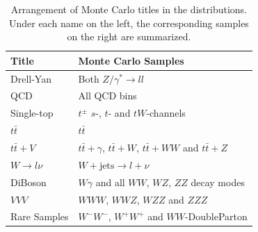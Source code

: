 \begin{table}[!htb]
  \centering
  \begin{tabular}{|l|l|}
\hline
Title & Monte Carlo Samples \\
\hline
Drell-Yan & Both $Z/\gamma^* \rightarrow ll$ \\
QCD & All QCD bins \\
Single-top & $t^\pm$ $s$-, $t$- and $tW$-channels \\
$t \bar{t}$ & $t \bar{t}$ \\
$t \bar{t} + V$ & $t \bar{t} + \gamma$, $t \bar{t} + W$, $t \bar{t} + WW$ and $t \bar{t} + Z$ \\
$W \rightarrow l \nu$ & $W + \text{jets} \rightarrow l + \nu$ \\
DiBoson & $W\gamma$ and all $WW$, $WZ$, $ZZ$ decay modes \\
$VVV$ & $WWW$, $WWZ$, $WZZ$ and $ZZZ$ \\
Rare Samples & $W^-W^-$, $W^+W^+$ and $WW$-DoubleParton \\
\hline
  \end{tabular}
  \caption{Arrangement of Monte Carlo titles in the distributions. Under each name on the left, the corresponding samples on the right are summarized.}
  \label{tab:mcpooltitles}
\end{table}

